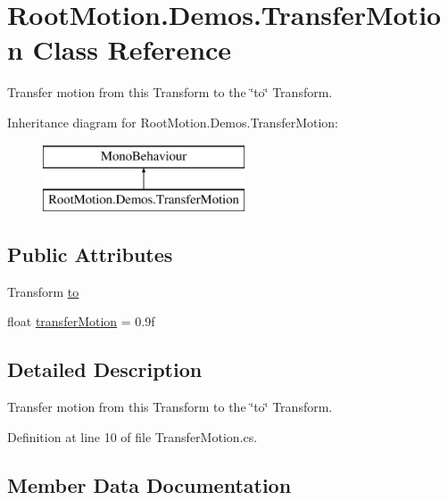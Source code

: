\hypertarget{class_root_motion_1_1_demos_1_1_transfer_motion}{}\section{Root\+Motion.\+Demos.\+Transfer\+Motion Class Reference}
\label{class_root_motion_1_1_demos_1_1_transfer_motion}


Transfer motion from this Transform to the \char`\"{}to\char`\"{} Transform.  


Inheritance diagram for Root\+Motion.\+Demos.\+Transfer\+Motion\+:\begin{figure}[H]
\begin{center}
\leavevmode
\includegraphics[height=2.000000cm]{class_root_motion_1_1_demos_1_1_transfer_motion}
\end{center}
\end{figure}
\subsection*{Public Attributes}
\begin{DoxyCompactItemize}
\item 
Transform \mbox{\hyperlink{class_root_motion_1_1_demos_1_1_transfer_motion_a4edf04bac7141e349e7e872e90a44d4d}{to}}
\item 
float \mbox{\hyperlink{class_root_motion_1_1_demos_1_1_transfer_motion_a8a0c39a4ed9c65e79730cd945094e9ed}{transfer\+Motion}} = 0.\+9f
\end{DoxyCompactItemize}


\subsection{Detailed Description}
Transfer motion from this Transform to the \char`\"{}to\char`\"{} Transform. 



Definition at line 10 of file Transfer\+Motion.\+cs.



\subsection{Member Data Documentation}
\mbox{\label{class_root_motion_1_1_demos_1_1_transfer_motion_a4edf04bac7141e349e7e872e90a44d4d}} 
